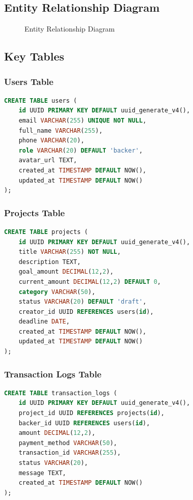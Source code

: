 \documentclass[a4paper,12pt]{report}
\begin{document}
\subsection{Entity Relationship Diagram}

\begin{figure}[h]
    \centering
    \caption{Entity Relationship Diagram}
    \label{fig:erd}
\end{figure}

\subsection{Key Tables}

\subsubsection{Users Table}
\begin{lstlisting}[language=SQL, caption=Users Table Schema]
CREATE TABLE users (
    id UUID PRIMARY KEY DEFAULT uuid_generate_v4(),
    email VARCHAR(255) UNIQUE NOT NULL,
    full_name VARCHAR(255),
    phone VARCHAR(20),
    role VARCHAR(20) DEFAULT 'backer',
    avatar_url TEXT,
    created_at TIMESTAMP DEFAULT NOW(),
    updated_at TIMESTAMP DEFAULT NOW()
);
\end{lstlisting}

\subsubsection{Projects Table}
\begin{lstlisting}[language=SQL, caption=Projects Table Schema]
CREATE TABLE projects (
    id UUID PRIMARY KEY DEFAULT uuid_generate_v4(),
    title VARCHAR(255) NOT NULL,
    description TEXT,
    goal_amount DECIMAL(12,2),
    current_amount DECIMAL(12,2) DEFAULT 0,
    category VARCHAR(50),
    status VARCHAR(20) DEFAULT 'draft',
    creator_id UUID REFERENCES users(id),
    deadline DATE,
    created_at TIMESTAMP DEFAULT NOW(),
    updated_at TIMESTAMP DEFAULT NOW()
);
\end{lstlisting}

\subsubsection{Transaction Logs Table}
\begin{lstlisting}[language=SQL, caption=Transaction Logs Table Schema]
CREATE TABLE transaction_logs (
    id UUID PRIMARY KEY DEFAULT uuid_generate_v4(),
    project_id UUID REFERENCES projects(id),
    backer_id UUID REFERENCES users(id),
    amount DECIMAL(12,2),
    payment_method VARCHAR(50),
    transaction_id VARCHAR(255),
    status VARCHAR(20),
    message TEXT,
    created_at TIMESTAMP DEFAULT NOW()
);
\end{lstlisting}
\end{document}

